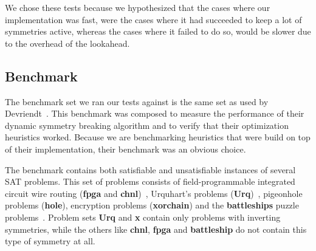 	We chose these tests because we hypothesized that the cases where our implementation was fast,
	were the cases where it had succeeded to keep a lot of symmetries active,
	whereas the cases where it failed to do so, would be slower due to the overhead of the lookahead.

\subsection{Benchmark}
\label{ssec:benchmark}
	The benchmark set we ran our tests against is the same set as used by Devriendt~\cite{devriendt2012symmetry}.
	This benchmark was composed to measure the performance of their dynamic symmetry
	breaking algorithm and to verify that their optimization heuristics worked.
	Because we are benchmarking heuristics that were build on top of their implementation, their
	benchmark was an obvious choice.

	The benchmark contains both satisfiable and unsatisfiable instances of several SAT problems.
	This set of problems consists of field-programmable integrated circuit wire routing (\textbf{fpga} and
	\textbf{chnl})~\cite{nam2004comparative}, Urquhart's problems (\textbf{Urq})~\cite{urquhart1987hard},
	pigeonhole problems (\textbf{hole}), encryption problems (\textbf{xorchain}) and the \textbf{battleships}
	puzzle problems~\cite{sevenster2004battleships}.
	Problem sets \textbf{Urq} and \textbf{x} contain only problems with inverting symmetries, while the
	others like \textbf{chnl}, \textbf{fpga} and \textbf{battleship} do not contain this type of symmetry
	at all\cite{devriendt2012symmetry}.
